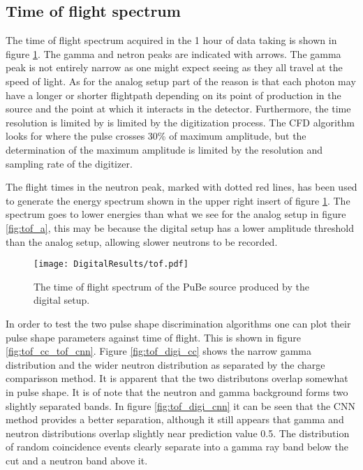 \documentclass[main.tex]{subfiles}
\begin{document}
\clearpage
\subsection{Time of flight spectrum}
The time of flight spectrum acquired in the 1 hour of data taking is shown in figure \ref{fig:tof_d}. The gamma and netron peaks are indicated with arrows. The gamma peak is not entirely narrow as one might expect seeing as they all travel at the speed of light. As for the analog setup part of the reason is that each photon may have a longer or shorter flightpath depending on its point of production in the source and the point at which it interacts in the detector. Furthermore, the time resolution is limited by is limited by the digitization process. The CFD algorithm looks for where the pulse crosses 30\% of maximum amplitude, but the determination of the maximum amplitude is limited by the resolution and sampling rate of the digitizer.

The flight times in the neutron peak, marked with dotted red lines, has been used to generate the energy spectrum shown in the upper right insert of figure \ref{fig:tof_d}. The spectrum goes to lower energies than what we see for the analog setup in figure \ref{fig:tof_a}, this may be because the digital setup has a lower amplitude threshold than the analog setup, allowing slower neutrons to be recorded.
\begin{figure}[ht]
    \centering
        \texttt{[image: DigitalResults/tof.pdf]}
        \caption{The time of flight spectrum of the PuBe source produced by the digital setup.}
    \label{fig:tof_d} 
\end{figure}

In order to test the two pulse shape discrimination algorithms one can plot their pulse shape parameters against time of flight. This is shown in figure \ref{fig:tof_cc_tof_cnn}. Figure \ref{fig:tof_digi_cc} shows the narrow gamma distribution and the wider neutron distribution as separated by the charge comparisson method. It is apparent that the two distributons overlap somewhat in pulse shape. It is of note that the neutron and gamma background forms two slightly separated bands.  In figure \ref{fig:tof_digi_cnn} it can be seen that the CNN method provides a better separation, although it still appears that gamma and neutron distributions overlap slightly near prediction value 0.5. The distribution of random coincidence events clearly separate into a gamma ray band below the cut and a neutron band above it.
\end{document}

